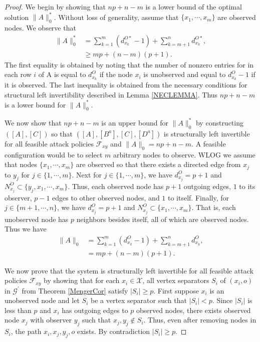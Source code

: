 \documentclass[letterpaper, 10 pt, conference]{ieeeconf}
\begin{document}
\begin{proof}
We begin by showing that $np + n -m$ is a lower bound of the optimal solution $\|A\|_0^*$.  Without loss of generality, assume that $\{x_1,\cdots,x_m\}$ are observed nodes. We observe that 
\begin{align*}
\|A\|_0^*  &= \sum_{k=1}^m (d_{x_k}^{O*} - 1) + \sum_{k=m+1}^n d_{x_k}^{O*} , \\
  &\ge mp + (n-m)(p+1) . 
 \end{align*}
The first equality is obtained by noting that the number of nonzero entries for in each row $i$ of A is equal to $d_{x_k}^{O}$ if the node $x_i$ is unobserved and equal to $d_{x_k}^{O}-1$ if it is observed. The last inequality is obtained from the necessary conditions for structural left invertibility described in Lemma \ref{NECLEMMA}. Thus $np+n-m$ is a lower bound for $\|A\|_0^*$.

We now show that $np+n-m$ is an upper bound for $\|A\|_0^*$ by constructing  $([A],[C])$ so that $ ([A],[B^a],[C],[D^a])$ is structurally left invertible for all feasible attack policies $\mathcal{F}_{xy}$ and $\|A\|_0 = np +n - m$. A feasible configuration would be to select $m$ arbitrary nodes to observe. WLOG we assume that nodes $\{x_1,\cdots, x_m\}$ are observed so that there exists a directed edge from $x_j$ to $y_j$ for $j \in \{1,\cdots,m\}$. Next for $j \in \{1,\cdots,m\}$, we have $d_{x_j}^O = p+1$ and  $N_{x_j}^O \subset \{y_j, x_1, \cdots, x_m \}$. Thus, each observed node has $p+1$ outgoing edges, $1$ to its observer, $p-1$ edges to other observed nodes, and $1$ to itself. Finally, for $j \in \{m+1,\cdots, n\}$, we have $d_{x_j}^O = p+1$ and  $N_{x_j}^O \subset \{ x_1, \cdots,  x_m \}$. That is, each unobserved node has $p$ neighbors besides itself, all of which are observed nodes. Thus we have
\begin{align*}
\|A\|_0  &= \sum_{k=1}^m (d_{x_k}^{O} - 1) + \sum_{k=m+1}^n d_{x_k}^{O} , \\
  &= mp + (n-m)(p+1) .  
 \end{align*}

We now prove that the system is structurally left invertible for all feasible attack policies $\mathcal{F}_{xy}$ by showing that for each $x_i \in \mathcal{X}$, all vertex separators $S_i$ of $(x_i,o)$ in $\mathcal{G}^\prime$ from Theorem \ref{MengerCor} satisfy $|S_i| \ge p$. First suppose $x_i$ is an unobserved node and let $S_i$ be a vertex separator such that $|S_i| < p$. Since $|S_i|$ is less than $p$ and $x_i$ has outgoing edges to $p$ observed nodes, there exists observed node $x_j$ with observer $y_j$ such that $x_j, y_j \notin S_i$. Thus, even after removing nodes in $S_i$, the path $x_i, x_j, y_j, o$ exists. By contradiction $|S_i| \ge p$. 


\end{proof}
\end{document}
